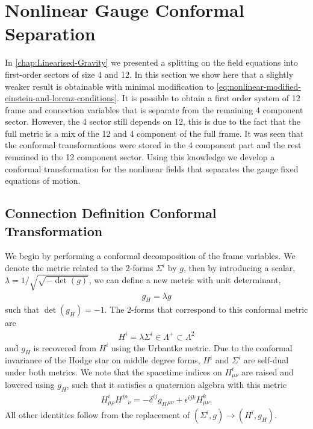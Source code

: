 \documentclass[10pt]{report}
\newcommand{\urb}[0]{Urbantke}
\theoremstyle{definition}
\begin{document}
        \section{Nonlinear Gauge Conformal Separation} \label{sec:nonlin-pleb-conformal-separation}
        In \cref{chap:Linearised-Gravity} we presented a splitting on the field equations into first-order sectors of size 4 and 12. In this section we show here that a slightly weaker result is obtainable with minimal modification to \cref{eq:nonlinear-modified-einstein-and-lorenz-conditions}. It is possible to obtain a first order system of 12 frame and connection variables that is separate from the remaining 4 component sector. However, the 4 sector still depends on 12, this is due to the fact that the full metric is a mix of the 12 and 4 component of the full frame. It was seen that the conformal transformations were stored in the 4 component part and the rest remained in the 12 component sector. Using this knowledge we develop a conformal transformation for the nonlinear fields that separates the gauge fixed equations of motion.

        \subsection{Connection Definition Conformal Transformation}
        We begin by performing a conformal decomposition of the frame variables. We denote the metric related to the 2-forms $\Sigma^i$ by $g$, then by introducing a scalar, $\lambda = 1/\sqrt{\sqrt{-\det(g)}}$,  we can define a new metric with unit determinant,
        \begin{align}
            g_H = \lambda g \label{eq:nonlinear-conformal-metric}
        \end{align}
        such that $\det(g_H) = -1$. The 2-forms that correspond to this conformal metric are
        \begin{align}
            H^i = \lambda \Sigma^i \in \Lambda^+ \subset \Lambda^2
        \end{align}
        and $g_H$ is recovered from $H^i$ using the \urb{} metric. Due to the conformal invariance of the Hodge star on middle degree forms, $H^i$ and $\Sigma^i$ are self-dual under both metrics. We note that the spacetime indices on $H^i_{\mu\nu}$ are raised and lowered using $g_H$, such that it satisfies a quaternion algebra with this metric 
        \begin{align}
            H^i_{\mu\rho} H^{j\rho}{}_\nu = -\delta^{ij}g_H{}_{\mu\nu} + \epsilon^{ijk} H^k_{\mu\nu}. \label{eq:conformal-H-quaternion-algebra}
        \end{align}
        All other identities follow from the replacement of $(\Sigma^i,g) \rightarrow (H^i,g_H)$.
\end{document}
